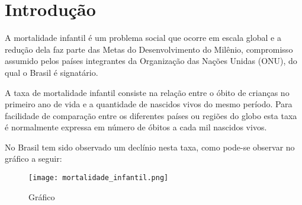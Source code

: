 \chapter{Introdução}
A mortalidade infantil é um problema social que ocorre em escala global e a redução
dela faz parte das Metas do Desenvolvimento do Milênio, compromisso assumido pelos países
integrantes da Organização das Nações Unidas (ONU), do qual o Brasil é signatário.

A taxa de mortalidade infantil consiste na relação entre o óbito de crianças no primeiro ano
de vida e a quantidade de nascidos vivos do mesmo período. Para facilidade de comparação entre
os diferentes países ou regiões do globo esta taxa é normalmente expressa em número de óbitos a
cada mil nascidos vivos.

No Brasil tem sido observado um declínio nesta taxa, como pode-se observar no gráfico a seguir:

\begin{figure}
  \texttt{[image: mortalidade\_infantil.png]}
  \caption{Gráfico}
\end{figure}
